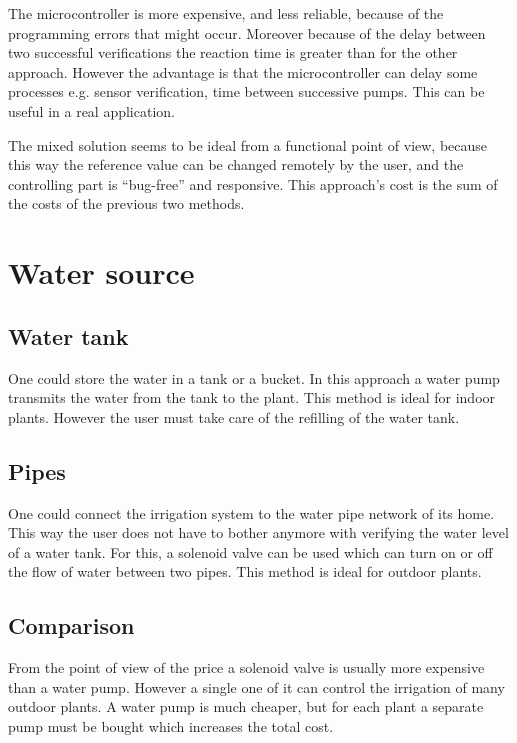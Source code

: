 The microcontroller is more expensive, and less reliable, because of the programming errors that might occur. Moreover because of the delay between two successful verifications the reaction time is greater than for the other approach. However the advantage is that the microcontroller can delay some processes e.g. sensor verification, time between successive pumps. This can be useful in a real application.

The mixed solution seems to be ideal from a functional point of view, because this way the reference value can be changed remotely by the user, and the controlling part is ``bug-free'' and responsive. This approach's cost is the sum of the costs of the previous two methods.

\section{Water source}

\subsection{Water tank}

One could store the water in a tank or a bucket. In this approach a water pump transmits the water from the tank to the plant. This method is ideal for indoor plants. However the user must take care of the refilling of the water tank.

\subsection{Pipes}

One could connect the irrigation system to the water pipe network of its home. This way the user does not have to bother anymore with verifying the water level of a water tank. For this, a solenoid valve can be used which can turn on or off the flow of water between two pipes. This method is ideal for outdoor plants.

\subsection{Comparison}

From the point of view of the price a solenoid valve is usually more expensive than a water pump. However a single one of it can control the irrigation of many outdoor plants. A water pump is much cheaper,  but for each plant a separate pump must be bought which increases the total cost.


